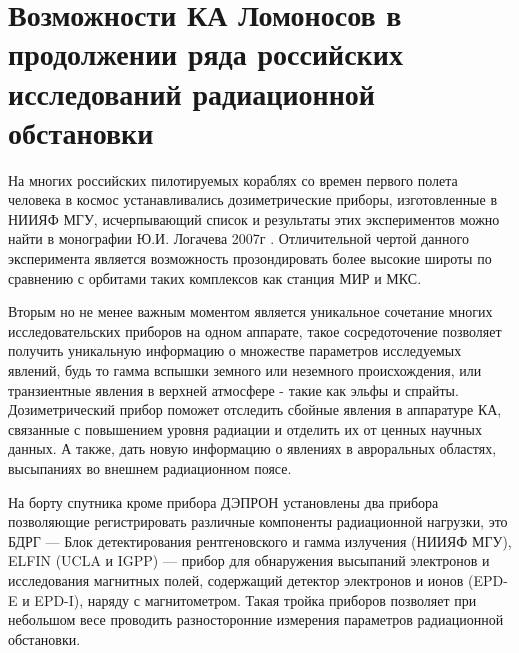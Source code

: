 \section{Возможности КА Ломоносов в продолжении ряда российских исследований радиационной обстановки}

На многих российских пилотируемых кораблях со времен первого полета человека в космос устанавливались дозиметрические приборы, изготовленные в НИИЯФ МГУ, исчерпывающий список и результаты этих экспериментов можно найти в монографии Ю.И. Логачева 2007г \cite{logachev2007}. Отличительной чертой данного эксперимента является возможность прозондировать более высокие широты по сравнению с орбитами таких комплексов как станция МИР и МКС. 

Вторым но не менее важным моментом является уникальное сочетание многих исследовательских приборов на одном аппарате, такое сосредоточение позволяет получить уникальную информацию о множестве параметров исследуемых явлений, будь то гамма вспышки земного или неземного происхождения, или транзиентные явления в верхней атмосфере - такие как эльфы и спрайты. Дозиметрический прибор поможет отследить сбойные явления в аппаратуре КА, связанные с повышением уровня радиации и отделить их от ценных научных данных. А также, дать новую информацию о явлениях в авроральных областях, высыпаниях во внешнем радиационном поясе.

На борту спутника кроме прибора ДЭПРОН установлены два прибора позволяющие регистрировать различные компоненты радиационной нагрузки, это БДРГ --- Блок детектирования рентгеновского и гамма излучения (НИИЯФ МГУ), ELFIN (UCLA и IGPP) --- прибор для обнаружения высыпаний электронов и исследования магнитных полей, содержащий детектор электронов и ионов (EPD-E и EPD-I), наряду с магнитометром. Такая тройка приборов позволяет при небольшом весе проводить разносторонние измерения параметров радиационной обстановки.



